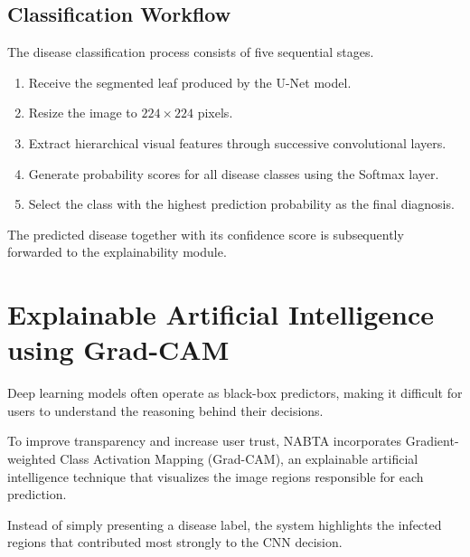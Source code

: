 \subsection{Classification Workflow}

The disease classification process consists of five sequential stages.

\begin{enumerate}[leftmargin=*,label=\textbf{C\arabic*.}]

\item Receive the segmented leaf produced by the U-Net model.

\item Resize the image to $224 \times 224$ pixels.

\item Extract hierarchical visual features through successive convolutional layers.

\item Generate probability scores for all disease classes using the Softmax layer.

\item Select the class with the highest prediction probability as the final diagnosis.

\end{enumerate}

The predicted disease together with its confidence score is subsequently forwarded to the explainability module.

\section{Explainable Artificial Intelligence using Grad-CAM}
\label{sec:gradcam_methodology}

Deep learning models often operate as black-box predictors, making it difficult for users to understand the reasoning behind their decisions.

To improve transparency and increase user trust, NABTA incorporates Gradient-weighted Class Activation Mapping (Grad-CAM), an explainable artificial intelligence technique that visualizes the image regions responsible for each prediction.

Instead of simply presenting a disease label, the system highlights the infected regions that contributed most strongly to the CNN decision.

